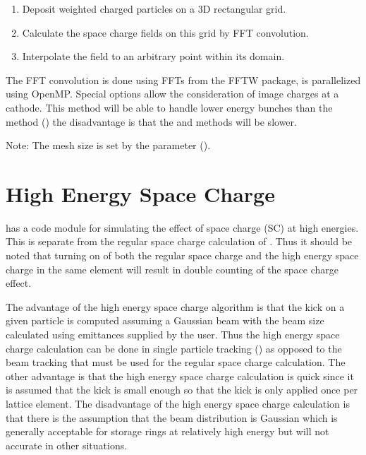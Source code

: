 \begin{enumerate}
\item Deposit weighted charged particles on a 3D rectangular grid.
\item Calculate the space charge fields on this grid by FFT convolution. 
\item Interpolate the field to an arbitrary point within its domain.
\end{enumerate}

The FFT convolution is done using FFTs from the FFTW package, is parallelized using OpenMP.
Special options allow the consideration of image charges at a cathode.
This method will be able to handle lower energy bunches than the  method ()
the disadvantage is that the  and  methods will be slower.

Note: The mesh size is set by the  parameter 
().

\section{High Energy Space Charge}
\label{s:he.space.charge}

\bmad has a code module for simulating the effect of space charge (SC) at high energies. This is
separate from the regular space charge calculation of . Thus it should be noted that
turning on of both the regular space charge and the high energy space charge in the same element
will result in double counting of the space charge effect.

The advantage of the high energy space charge algorithm is that the kick on a given particle is
computed assuming a Gaussian beam with the beam size calculated using emittances supplied by the
user. Thus the high energy space charge calculation can be done in single particle tracking
() as opposed to the beam tracking that must be used for the regular space charge
calculation. The other advantage is that the high energy space charge calculation is quick since it
is assumed that the kick is small enough so that the kick is only applied once per lattice
element. The disadvantage of the high energy space charge calculation is that there is the
assumption that the beam distribution is Gaussian which is generally acceptable for storage rings at
relatively high energy but will not accurate in other situations.

